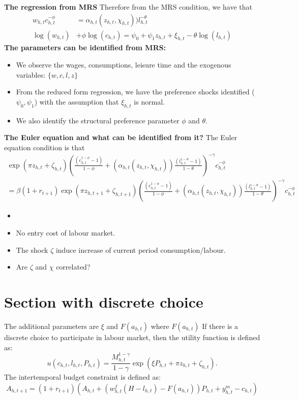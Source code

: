 \textbf{The regression from MRS}
Therefore from the MRS condition, we have that
\[\begin{split}
   w_{h,t}c_{h,t}^{-\phi} &= \alpha_{h,t}(z_{h,t},\chi_{h,t})) l_{h,t}^{-\theta}  \\
   \log(w_{h,t})& + \phi \log(c_{h,t})  = \psi_0 + \psi_1 z_{h,t} + \xi_{h,t} - \theta \log(l_{h,t})
\end{split} \]
\textbf{The parameters can be identified from MRS:}
\begin{itemize}
  \item We observe the wages, consumptions, leisure time and the exogenous variables: $\{w,c,l,z\}$
  \item From the reduced form regression, we have the preference shocks identified ($\psi_0,\psi_1$) with the assumption that $\xi_{h,t}$ is normal.
  \item We also identify the structural preference parameter $\phi$ and $\theta$.

\end{itemize}
\textbf{The Euler equation and what can be identified from it?}
The Euler equation condition is that
\[ \begin{split}
  \exp{( \pi z_{h,t} + \zeta_{h,t} )} \left( \frac{(c_{h,t}^{1 - \phi} - 1)}{1 - \phi} + (\alpha_{h,t}(z_{h,t},\chi_{h,t})) \frac{(l_{h,t}^{1 - \theta} -1)}{ 1 - \theta}\right)^{-\gamma} c_{h,t}^{-\phi} \\
  = \beta (1+r_{t+1}) \exp{( \pi z_{h,t+1} + \zeta_{h,t+1} )} \left( \frac{(c_{h,t}^{1 - \phi} - 1)}{1 - \phi} + (\alpha_{h,t}(z_{h,t},\chi_{h,t})) \frac{(l_{h,t}^{1 - \theta} -1)}{ 1 - \theta}\right)^{-\gamma} c_{h,t}^{-\phi}
\end{split} \]
\begin{itemize}
  \item
\end{itemize}

\begin{itemize}
  \item No entry cost of labour market.
  \item The shock $\zeta$ induce increase of current period consumption/labour.
  \item Are $\zeta$ and $\chi$ correlated?
\end{itemize}

\section{Section with discrete choice}
The additional parameters are $\xi$ and $F(a_{h,t})$ where $F(a_{h,t})$
If there is a discrete choice to participate in labour market, then the utility function is defined as:
\[ u(c_{h,t},l_{h,t},P_{h,t}) = \frac{M^{1-\gamma}_{h,t}}{1 - \gamma} \exp{(\xi P_{h,t} + \pi z_{h,t} + \zeta_{h,t} )} .\]
The intertemporal budget constraint is defined as:
\[ A_{h,t+1} = (1 + r_{t+1}) \left( A_{h,t} + \left(w_{h,t}^f(H-l_{h,t}) - F(a_{h,t}) \right)P_{h,t} + y_{h,t}^m - c_{h,t} \right)\]
